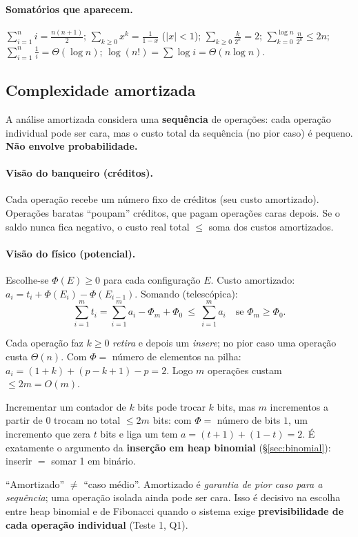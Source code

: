 \paragraph{Somatórios que aparecem.} $\sum_{i=1}^n i=\frac{n(n+1)}2$; $\sum_{k\ge0}x^k=\frac1{1-x}$ ($|x|<1$); $\sum_{k\ge0}\frac{k}{2^k}=2$; $\sum_{k=0}^{\log n}\frac{n}{2^k}\le 2n$; $\sum_{i=1}^n\frac1i=\Theta(\log n)$; $\log(n!)=\sum\log i=\Theta(n\log n)$.

\subsection{Complexidade amortizada}\label{sec:amort}
A análise amortizada considera uma \textbf{sequência} de operações: cada operação individual pode ser cara, mas o custo total da sequência (no pior caso) é pequeno. \textbf{Não envolve probabilidade.}

\paragraph{Visão do banqueiro (créditos).} Cada operação recebe um número fixo de créditos (seu custo amortizado). Operações baratas ``poupam'' créditos, que pagam operações caras depois. Se o saldo nunca fica negativo, o custo real total $\le$ soma dos custos amortizados.

\paragraph{Visão do físico (potencial).} Escolhe-se $\Phi(E)\ge0$ para cada configuração $E$. Custo amortizado: $a_i=t_i+\Phi(E_i)-\Phi(E_{i-1})$. Somando (telescópica):
\[
\sum_{i=1}^m t_i=\sum_{i=1}^m a_i-\Phi_m+\Phi_0\ \le\ \sum_{i=1}^m a_i\quad\text{se }\Phi_m\ge\Phi_0 .
\]

\begin{exemplo}
Cada operação faz $k\ge0$ \emph{retira} e depois um \emph{insere}; no pior caso uma operação custa $\Theta(n)$. Com $\Phi=$ número de elementos na pilha: $a_i=(1+k)+(p-k+1)-p=2$. Logo $m$ operações custam $\le 2m=O(m)$.
\end{exemplo}
\begin{exemplo}
Incrementar um contador de $k$ bits pode trocar $k$ bits, mas $m$ incrementos a partir de $0$ trocam no total $\le 2m$ bits: com $\Phi=$ número de bits $1$, um incremento que zera $t$ bits e liga um tem $a=(t+1)+(1-t)=2$. É exatamente o argumento da \textbf{inserção em heap binomial} (§\ref{sec:binomial}): inserir $=$ somar 1 em binário.
\end{exemplo}

\begin{chave}
``Amortizado'' $\ne$ ``caso médio''. Amortizado é \emph{garantia de pior caso para a sequência}; uma operação isolada ainda pode ser cara. Isso é decisivo na escolha entre heap binomial e de Fibonacci quando o sistema exige \textbf{previsibilidade de cada operação individual} (Teste 1, Q1).
\end{chave}
